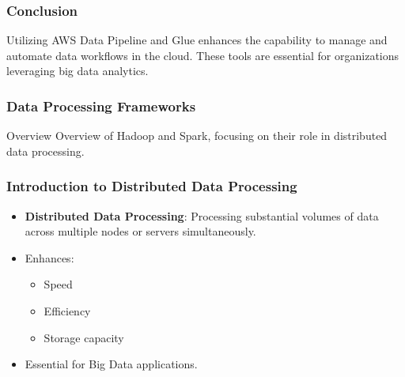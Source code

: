 \documentclass[aspectratio=169]{beamer}
\begin{document}
\begin{frame}
    \frametitle{Conclusion}
    Utilizing AWS Data Pipeline and Glue enhances the capability to manage and automate data workflows in the cloud. These tools are essential for organizations leveraging big data analytics.
\end{frame}

\begin{frame}[fragile]
    \frametitle{Data Processing Frameworks}
    \begin{block}{Overview}
        Overview of Hadoop and Spark, focusing on their role in distributed data processing.
    \end{block}
\end{frame}

\begin{frame}[fragile]
    \frametitle{Introduction to Distributed Data Processing}
    \begin{itemize}
        \item \textbf{Distributed Data Processing}: Processing substantial volumes of data across multiple nodes or servers simultaneously.
        \item Enhances:
        \begin{itemize}
            \item Speed
            \item Efficiency
            \item Storage capacity
        \end{itemize}
        \item Essential for Big Data applications.
    \end{itemize}
\end{frame}
\end{document}

